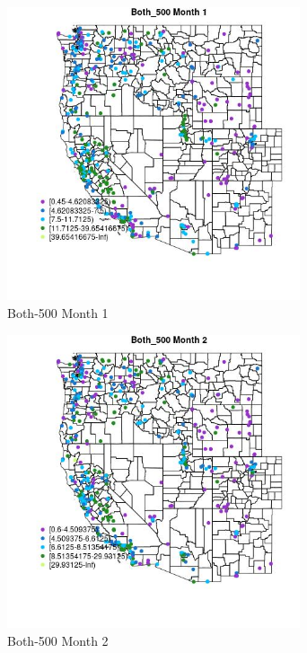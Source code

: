 \begin{figure} 
\centering  
\includegraphics[width=0.77\textwidth]{Code_Outputs/ML_input_report_ML_input_PM25_Step5_part_d_de_duplicated_aves_ML_input_MapObsMo1Both_500.jpg} 
\caption{\label{fig:ML_input_report_ML_input_PM25_Step5_part_d_de_duplicated_aves_ML_inputMapObsMo1Both_500}Both-500 Month 1} 
\end{figure} 
 

\clearpage 

\begin{figure} 
\centering  
\includegraphics[width=0.77\textwidth]{Code_Outputs/ML_input_report_ML_input_PM25_Step5_part_d_de_duplicated_aves_ML_input_MapObsMo2Both_500.jpg} 
\caption{\label{fig:ML_input_report_ML_input_PM25_Step5_part_d_de_duplicated_aves_ML_inputMapObsMo2Both_500}Both-500 Month 2} 
\end{figure} 
 

